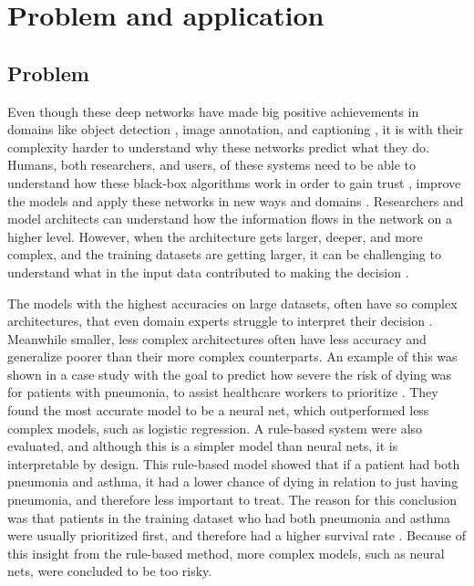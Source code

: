 \label{sec:2_problem_and_application}
\section{Problem and application}
\subsection{Problem}

Even though these deep networks have made big positive achievements in domains like object detection \cite{girshickRichFeatureHierarchies2014, renFasterRCNNRealTime2015, redmonYouOnlyLook2016, linFocalLossDense2017}, image annotation, and captioning \cite{vinyalsShowTellNeural2015, karpathyDeepVisualSemanticAlignments2015, johnsonDenseCapFullyConvolutional2016, tranRichImageCaptioning2016}, it is with their complexity harder to understand why these networks predict what they do. Humans, both researchers, and users, of these systems need to be able to understand how these black-box algorithms work in order to gain trust \cite{koehlerExplanationImaginationConfidence1991, herlockerExplainingCollaborativeFiltering2000, dzindoletRoleTrustAutomation2003}, improve the models and apply these networks in new ways and domains \cite{jiangArtificialIntelligenceHealthcare2017, tonekaboniWhatCliniciansWant2019, holzingerCausabilityExplainabilityArtificial2019, guptaDeepLearningObject2021, tjoaSurveyExplainableArtificial2021}. Researchers and model architects can understand how the information flows in the network on a higher level. However, when the architecture gets larger, deeper, and more complex, and the training datasets are getting larger, it can be challenging to understand what in the input data contributed to making the decision \cite{sagirogluBigDataReview2013}.

The models with the highest accuracies on large datasets, often have so complex architectures, that even domain experts struggle to interpret their decision \cite{caruanaIntelligibleModelsHealthCare2015}. Meanwhile smaller, less complex architectures often have less accuracy and generalize poorer than their more complex counterparts. An example of this was shown in a case study with the goal to predict how severe the risk of dying was for patients with pneumonia, to assist healthcare workers to prioritize \cite{cooperPredictingDireOutcomes2005}. They found the most accurate model to be a neural net, which outperformed less complex models, such as logistic regression. A rule-based system were also evaluated, and although this is a simpler model than neural nets, it is interpretable by design. This rule-based model showed that if a patient had both pneumonia and asthma, it had a lower chance of dying in relation to just having pneumonia, and therefore less important to treat. The reason for this conclusion was that patients in the training dataset who had both pneumonia and asthma were usually prioritized first, and therefore had a higher survival rate \cite{cooperEvaluationMachinelearningMethods1997}. Because of this insight from the rule-based method, more complex models, such as neural nets, were concluded to be too risky.

